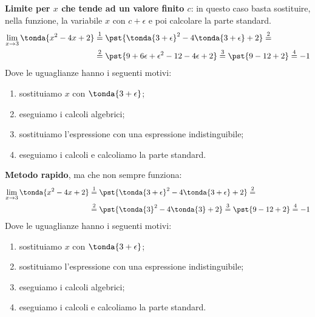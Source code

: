 \begin{esempio}
\textbf{Limite per \(x\) che tende ad un valore finito \(c\)}:
in questo caso basta sostituire, nella funzione, la variabile \(x\) con 
\(c+\epsilon\) e poi calcolare la parte standard.
\begin{align*}
\lim_{x \rightarrow 3} \tonda{x^2-4x+2} & \stackrel{1}{=} 
  \pst{\tonda{3+\epsilon}^2-4\tonda{3+\epsilon}+2} \stackrel{2}{=}\\  
  & \stackrel{2}{=} \pst{9 + 6 \epsilon + \epsilon^2 - 12 - 4\epsilon + 2} 
  \stackrel{3}{=} \pst{9 - 12 + 2} \stackrel{4}{=} -1
\end{align*}
Dove le uguaglianze hanno i seguenti motivi:
\begin{enumerate} [nosep]
 \item sostituiamo \(x\) con \(\tonda{3+\epsilon}\);
 \item eseguiamo i calcoli algebrici;
 \item sostituiamo l'espressione con una espressione indistinguibile;
 \item eseguiamo i calcoli e calcoliamo la parte standard.
\end{enumerate}
\end{esempio}

\begin{esempio}
\textbf{Metodo rapido}, ma che non sempre funziona:
\begin{align*}
\lim_{x \rightarrow 3} \tonda{x^2-4x+2} & \stackrel{1}{=} 
  \pst{\tonda{3+\epsilon}^2-4\tonda{3+\epsilon}+2} \stackrel{2}{=}\\ 
  & \stackrel{2}{=}\pst{\tonda{3}^2-4\tonda{3}+2} \stackrel{3}{=}
  \pst{9 - 12 + 2} \stackrel{4}{=} -1
\end{align*}
Dove le uguaglianze hanno i seguenti motivi:
\begin{enumerate} [nosep]
 \item sostituiamo \(x\) con \(\tonda{3+\epsilon}\);
 \item sostituiamo l'espressione con una espressione indistinguibile;
 \item eseguiamo i calcoli algebrici;
 \item eseguiamo i calcoli e calcoliamo la parte standard.
\end{enumerate}
\end{esempio}

